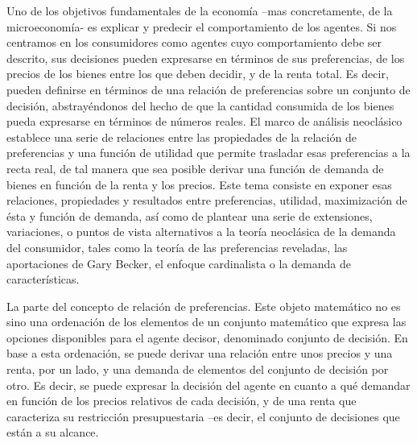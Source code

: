 \documentclass{nuevotema}
\begin{document}
\ideaclave

Uno de los objetivos fundamentales de la economía --mas concretamente, de la microeconomía- es explicar y predecir el comportamiento de los agentes. Si nos centramos en los consumidores como agentes cuyo comportamiento debe ser descrito, sus decisiones pueden expresarse en términos de sus preferencias, de los precios de los bienes entre los que deben decidir, y de la renta total. Es decir, pueden definirse en términos de una relación de preferencias sobre un conjunto de decisión, abstrayéndonos del hecho de que la cantidad consumida de los bienes pueda expresarse en términos de números reales. El marco de análisis neoclásico establece una serie de relaciones entre las propiedades de la relación de preferencias y una función de utilidad que permite trasladar esas preferencias a la recta real, de tal manera que sea posible derivar una función de demanda de bienes en función de la renta y los precios. Este tema consiste en exponer esas relaciones, propiedades y resultados entre preferencias, utilidad, maximización de ésta y función de demanda, así como de plantear una serie de extensiones, variaciones, o puntos de vista alternativos a la teoría neoclásica de la demanda del consumidor, tales como la teoría de las preferencias reveladas, las aportaciones de Gary Becker, el enfoque cardinalista o la demanda de características.

La  parte del concepto de relación de preferencias. Este objeto matemático no es sino una ordenación de los elementos de un conjunto matemático que expresa las opciones disponibles para el agente decisor, denominado conjunto de decisión. En base a esta ordenación, se puede derivar una relación entre unos precios y una renta, por un lado, y una demanda de elementos del conjunto de decisión por otro. Es decir, se puede expresar la decisión del agente en cuanto a qué demandar en función de los precios relativos de cada decisión, y de una renta que caracteriza su restricción presupuestaria --es decir, el conjunto de decisiones que están a su alcance. 
\end{document}
